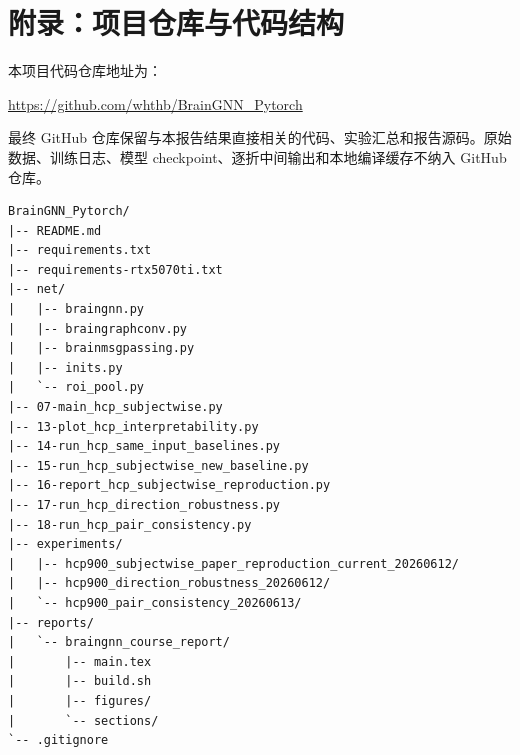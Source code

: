 \chapter*{附录：项目仓库与代码结构}

本项目代码仓库地址为：

\begin{center}
\url{https://github.com/whthb/BrainGNN_Pytorch}
\end{center}

最终 GitHub 仓库保留与本报告结果直接相关的代码、实验汇总和报告源码。原始数据、训练日志、模型 checkpoint、逐折中间输出和本地编译缓存不纳入 GitHub 仓库。

\begin{verbatim}
BrainGNN_Pytorch/
|-- README.md
|-- requirements.txt
|-- requirements-rtx5070ti.txt
|-- net/
|   |-- braingnn.py
|   |-- braingraphconv.py
|   |-- brainmsgpassing.py
|   |-- inits.py
|   `-- roi_pool.py
|-- 07-main_hcp_subjectwise.py
|-- 13-plot_hcp_interpretability.py
|-- 14-run_hcp_same_input_baselines.py
|-- 15-run_hcp_subjectwise_new_baseline.py
|-- 16-report_hcp_subjectwise_reproduction.py
|-- 17-run_hcp_direction_robustness.py
|-- 18-run_hcp_pair_consistency.py
|-- experiments/
|   |-- hcp900_subjectwise_paper_reproduction_current_20260612/
|   |-- hcp900_direction_robustness_20260612/
|   `-- hcp900_pair_consistency_20260613/
|-- reports/
|   `-- braingnn_course_report/
|       |-- main.tex
|       |-- build.sh
|       |-- figures/
|       `-- sections/
`-- .gitignore
\end{verbatim}
